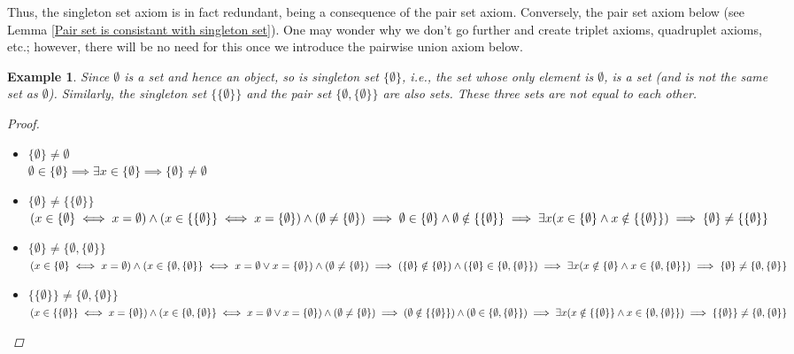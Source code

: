 \documentclass[a4paper]{book}
\newtheorem*{proof}{\textit{Proof.}}
\theoremstyle{break}
\newtheorem{example}{Example}[section]
\begin{document}
			Thus, the singleton set axiom is in fact redundant, being a consequence of the pair set axiom. Conversely, the pair set axiom below (see Lemma \ref{Pair set is consistant with singleton set}). One may wonder why we don't go further and create triplet axioms, quadruplet axioms, etc.; however, there will be no need for this once we introduce the pairwise union axiom below.
			\begin{example}
				Since $\emptyset$ is a set and hence an object, so is singleton set $\{\emptyset\}$, \textit{i.e.,} the set whose only element is $\emptyset$, is a set (and is not the same set as $\emptyset$). Similarly, the singleton set $\{\{\emptyset\}\}$ and the pair set $\{\emptyset,\{\emptyset\}\}$ are also sets. These three sets are not equal to each other.
				\begin{proof}~
					\begin{itemize}
						\item $\{\emptyset\}\neq\emptyset$\\
						$\emptyset\in\{\emptyset\}\implies\exists x\in\{\emptyset\}\implies\{\emptyset\}\neq\emptyset$
						\item $\{\emptyset\}\neq\{\{\emptyset\}\}$\\
						$(x\in\{\emptyset\}\iff x=\emptyset)\land(x\in\{\{\emptyset\}\}\iff x=\{\emptyset\})\land(\emptyset\neq\{\emptyset\})\\\implies \emptyset\in\{\emptyset\}\land \emptyset\notin\{\{\emptyset\}\}\\\implies\exists x(x\in\{\emptyset\}\land x\notin\{\{\emptyset\}\})\\\implies\{\emptyset\}\neq\{\{\emptyset\}\}$
						\item $\{\emptyset\}\neq\{\emptyset,\{\emptyset\}\}$\\
						$(x\in\{\emptyset\}\iff x=\emptyset)\land(x\in\{\emptyset,\{\emptyset\}\}\iff x=\emptyset\lor x=\{\emptyset\})\land(\emptyset\neq\{\emptyset\})\\\implies (\{\emptyset\}\notin\{\emptyset\})\land(\{\emptyset\}\in\{\emptyset,\{\emptyset\}\})\\\implies\exists x(x\notin\{\emptyset\}\land x\in\{\emptyset,\{\emptyset\}\})\\\implies\{\emptyset\}\neq\{\emptyset,\{\emptyset\}\}$
						\item $\{\{\emptyset\}\}\neq\{\emptyset,\{\emptyset\}\}$\\
						$(x\in\{\{\emptyset\}\}\iff x=\{\emptyset\})\land(x\in\{\emptyset,\{\emptyset\}\}\iff x=\emptyset\lor x=\{\emptyset\})\land(\emptyset\neq\{\emptyset\})\\\implies (\emptyset\notin\{\{\emptyset\}\})\land(\emptyset\in\{\emptyset,\{\emptyset\}\})\\\implies\exists x(x\notin\{\{\emptyset\}\}\land x\in\{\emptyset,\{\emptyset\}\})\\\implies\{\{\emptyset\}\}\neq\{\emptyset,\{\emptyset\}\}$
					\end{itemize}
				\end{proof}
			\end{example}
\end{document}
